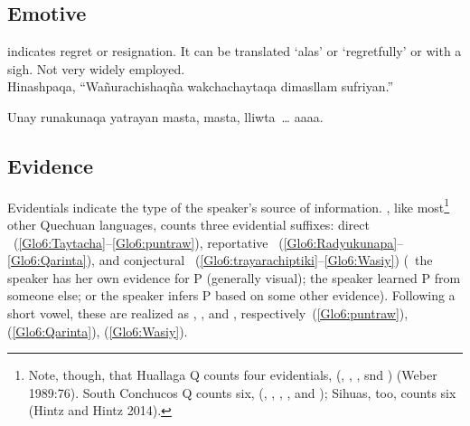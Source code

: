 \subsection{Emotive }\label{ssec:emotive}
 indicates regret or resignation. It can be translated ‘alas’ or ‘regretfully’ or with a sigh. Not very widely employed.\\

%
{Hinashpaqa, “Wañurachishaqña wakchachaytaqa dimasllam sufriyan.”}%
{}%
{}{}%

%
{Unay runakunaqa yatrayan masta, masta, lliwta~\dots{} aaaa.}%
{}%
{}{}%

\subsection{Evidence}\label{ssec:evidence}
Evidentials indicate the type of the speaker’s source of information. \SYQ, like most\footnote{Note, though, that Huallaga Q counts four evidentials, (, , , snd ) (Weber 1989:76). South Conchucos Q counts six, (, , , , and ); Sihuas, too, counts six (Hintz and Hintz 2014).} other Quechuan languages, counts three evidential suffixes: direct ~(\ref{Glo6:Taytacha}--\ref{Glo6:puntraw}), reportative ~(\ref{Glo6:Radyukunapa}--\ref{Glo6:Qarinta}), and conjectural ~(\ref{Glo6:trayarachiptiki}--\ref{Glo6:Wasiy}) (\ie~the speaker has her own evidence for P (generally visual); the speaker learned P from someone else; or the speaker infers P based on some other evidence). Following a short vowel, these are realized as , , and , respectively~(\ref{Glo6:puntraw}), (\ref{Glo6:Qarinta}), (\ref{Glo6:Wasiy}).\\

